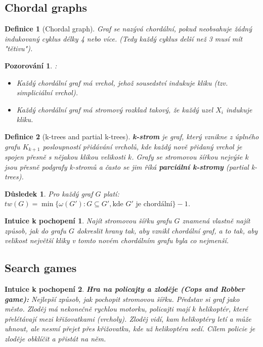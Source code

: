 \documentclass[a4paper,11pt]{article}
\newtheorem{definition}{Definice}[section]
\newtheorem{corollary}{Důsledek}[section]
\newtheorem{observation}{Pozorování}[section]
\newtheorem*{intuition}{Intuice k pochopení}
\begin{document}
\subsection{Chordal graphs}

\begin{definition}[Chordal graph]
Graf se nazývá chordální, pokud neobsahuje žádný indukovaný cyklus délky 4 nebo více. (Tedy každý cyklus delší než 3 musí mít "tětivu").
\end{definition}

\begin{observation}:
\begin{itemize}
    \item Každý chordální graf má vrchol, jehož sousedství indukuje kliku (tzv. simpliciální vrchol).
    \item Každý chordální graf má stromový rozklad takový, že každý uzel $X_i$ indukuje kliku.
\end{itemize}
\end{observation}

\begin{definition}[k-trees and partial k-trees]
\textbf{k-strom} je graf, který vznikne z úplného grafu $K_{k+1}$ posloupností přidávání vrcholů, kde každý nově přidaný vrchol je spojen přesně s nějakou klikou velikosti $k$. Grafy se stromovou šířkou nejvýše $k$ jsou přesně podgrafy k-stromů a často se jim říká \textbf{parciální k-stromy} (partial k-trees).
\end{definition}

\begin{corollary}
Pro každý graf $G$ platí: $tw(G) = \min\{\omega(G') : G \subseteq G', \text{kde } G' \text{ je chordální}\} - 1$.
\end{corollary}

\begin{intuition}
Najít stromovou šířku grafu $G$ znamená vlastně najít způsob, jak do grafu $G$ dokreslit hrany tak, aby vznikl chordální graf, a to tak, aby velikost největší kliky v tomto novém chordálním grafu byla co nejmenší.
\end{intuition}

\subsection{Search games}

\begin{intuition}
\textbf{Hra na policajty a zloděje (Cops and Robber game):} 
Nejlepší způsob, jak pochopit stromovou šířku. Představ si graf jako město. Zloděj má nekonečně rychlou motorku, policajti mají $k$ helikoptér, které přelétávají mezi křižovatkami (vrcholy). Zloděj vidí, kam helikoptéry letí a může uhnout, ale nesmí přejet přes křižovatku, kde už helikoptéra sedí. Cílem policie je zloděje obklíčit a přistát na něm.
\end{intuition}
\end{document}
